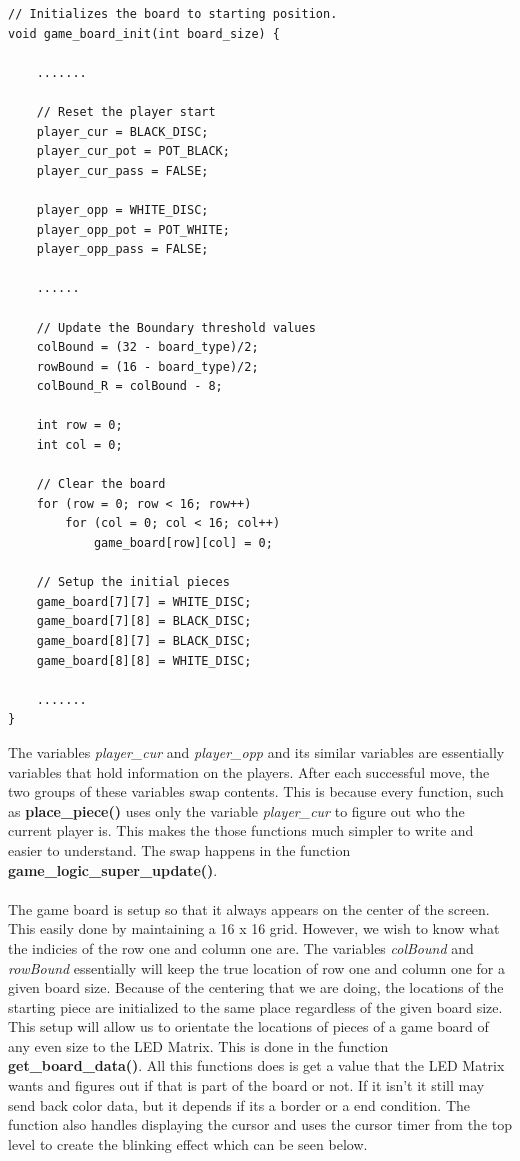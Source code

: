 \documentclass[a4paper, 12pt]{article}
\begin{document}
    \begin{verbatim}
// Initializes the board to starting position.
void game_board_init(int board_size) {
    
    .......

    // Reset the player start
    player_cur = BLACK_DISC;
    player_cur_pot = POT_BLACK;
    player_cur_pass = FALSE;
    
    player_opp = WHITE_DISC;
    player_opp_pot = POT_WHITE;
    player_opp_pass = FALSE;
    
    ......
    
    // Update the Boundary threshold values
    colBound = (32 - board_type)/2;
    rowBound = (16 - board_type)/2;
    colBound_R = colBound - 8;
    
    int row = 0;
    int col = 0;
    
    // Clear the board
    for (row = 0; row < 16; row++)
        for (col = 0; col < 16; col++)
            game_board[row][col] = 0;
    
    // Setup the initial pieces
    game_board[7][7] = WHITE_DISC;
    game_board[7][8] = BLACK_DISC;
    game_board[8][7] = BLACK_DISC;
    game_board[8][8] = WHITE_DISC;

    .......
}
    \end{verbatim}

    The variables \textit{player\_cur} and \textit{player\_opp} and its similar
    variables are essentially variables that hold information on the players.
    After each successful move, the two groups of these variables swap contents.
    This is because every function, such as \textbf{place\_piece()} uses only
    the variable \textit{player\_cur} to figure out who the current player is.
    This makes the those functions much simpler to write and easier to understand.
    The swap happens in the function \textbf{game\_logic\_super\_update()}.
    \\ \\
    The game board is setup so that it always appears on the center of the screen.
    This easily done by maintaining a 16 x 16 grid. However, we wish to know
    what the indicies of the row one and column one are. The variables
    \textit{colBound} and \textit{rowBound} essentially will keep the true
    location of row one and column one for a given board size. Because of the
    centering that we are doing, the locations of the starting piece are 
    initialized to the same place regardless of the given board size.
    This setup will allow us to orientate the locations of pieces of a game 
    board of any even size to the LED Matrix. This is done in the function 
    \textbf{get\_board\_data()}. All this functions does is get a value that
    the LED Matrix wants and figures out if that is part of the board or not.
    If it isn't it still may send back color data, but it depends if its a
    border or a end condition. The function also handles displaying the
    cursor and uses the cursor timer from the top level to create the
    blinking effect which can be seen below.
\end{document}
